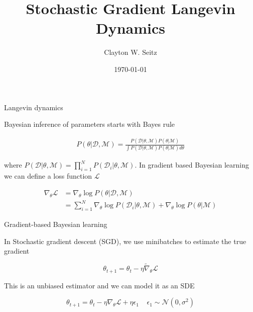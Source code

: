 \documentclass{beamer}					%
\title{Stochastic Gradient Langevin Dynamics}	%
\author{Clayton W. Seitz}								%
\date{\today}									%
\begin{document}
\begin{frame}
  \titlepage
\end{frame}


%


\begin{frame}{Langevin dynamics}

Bayesian inference of parameters starts with Bayes rule

\begin{align*}
P(\theta|\mathcal{D},\mathcal{M}) = \frac{P(\mathcal{D}|\theta,\mathcal{M})P(\theta|\mathcal{M})}{\int P(\mathcal{D}|\theta,\mathcal{M})P(\theta|\mathcal{M})d\theta}
\end{align*}

where $P(\mathcal{D}|\theta,\mathcal{M}) = \prod_{i=1}^{N}P(\mathcal{D}_{i}|\theta,\mathcal{M}) $. In gradient based Bayesian learning we can define a loss function $\mathcal{L}$ 

\begin{align*}
\nabla_{\theta}\mathcal{L} &= \nabla_{\theta} \log P(\theta|\mathcal{D},\mathcal{M})\\
&= \sum_{i=1}^{N} \nabla_{\theta}\log P(\mathcal{D}_{i}|\theta,\mathcal{M})  + \nabla_{\theta}\log P(\theta|\mathcal{M})
\end{align*}


\end{frame}


\begin{frame}{Gradient-based Bayesian learning}

In Stochastic gradient descent (SGD), we use minibatches to estimate the true gradient

\begin{equation*}
\theta_{t+1} = \theta_{t} - \eta \tilde{\nabla}_{\theta}\mathcal{L}
\end{equation*}

This is an unbiased estimator and we can model it as an SDE

\begin{equation*}
\theta_{t+1} = \theta_{t} - \eta \nabla_{\theta}\mathcal{L} + \eta\epsilon_{1} \;\;\;\; \epsilon_{1}\sim \mathcal{N}(0,\sigma^{2})
\end{equation*}

\end{frame}
\end{document}
